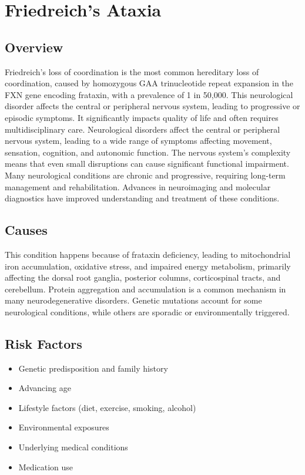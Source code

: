 \chapter{Friedreich's Ataxia}
\label{sec:Friedreich's Ataxia}

\section{Overview}
Friedreich's loss of coordination is the most common hereditary loss of coordination, caused by homozygous GAA trinucleotide repeat expansion in the FXN gene encoding frataxin, with a prevalence of 1 in 50,000. This neurological disorder affects the central or peripheral nervous system, leading to progressive or episodic symptoms. It significantly impacts quality of life and often requires multidisciplinary care. Neurological disorders affect the central or peripheral nervous system, leading to a wide range of symptoms affecting movement, sensation, cognition, and autonomic function. The nervous system's complexity means that even small disruptions can cause significant functional impairment. Many neurological conditions are chronic and progressive, requiring long-term management and rehabilitation. Advances in neuroimaging and molecular diagnostics have improved understanding and treatment of these conditions.
\section{Causes}
This condition happens because of frataxin deficiency, leading to mitochondrial iron accumulation, oxidative stress, and impaired energy metabolism, primarily affecting the dorsal root ganglia, posterior columns, corticospinal tracts, and cerebellum.    Protein aggregation and accumulation is a common mechanism in many neurodegenerative disorders.  Genetic mutations account for some neurological conditions, while others are sporadic or environmentally triggered.   
\section{Risk Factors}
\begin{itemize}[noitemsep]
  \item Genetic predisposition and family history
  \item Advancing age
  \item Lifestyle factors (diet, exercise, smoking, alcohol)
  \item Environmental exposures
  \item Underlying medical conditions
  \item Medication use
\end{itemize}
